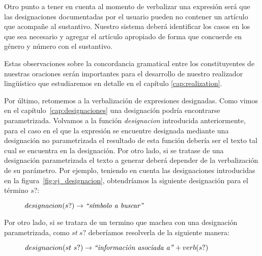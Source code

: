 Otro punto a tener en cuenta al momento de verbalizar una expresión será que las designaciones documentadas por el usuario pueden no contener un artículo que acompañe al sustantivo. Nuestro sistema deberá identificar los casos en los que sea necesario y agregar el artículo apropiado de forma que concuerde en género y número con el sustantivo. 

Estas observaciones sobre la concordancia gramatical entre los constituyentes de nuestras oraciones serán importantes para el desarrollo de nuestro realizador lingüístico que estudiaremos en detalle en el capítulo \ref{cap:realization}.

Por último, retomemos a la verbalización de expresiones designadas. Como vimos en el capítulo~\ref{cap:designaciones} una designación podría encontrarse parametrizada. Volvamos a la función \emph{designacion} introducida anteriormente, para el caso en el que la expresión se encuentre designada mediante una designación no parametrizada el resultado de esta función debería ser el texto tal cual se encuentra en la designación. Por otro lado, si se tratase de una designación parametrizada el texto a generar deberá depender de la verbalización de su parámetro. Por ejemplo, teniendo en cuenta las designaciones introducidas en la figura~\ref{fig:ej_designacion}, obtendríamos la siguiente designación para el término $s?$:

\begin{figure}[H]
\center
$designacion(s?) \rightarrow \text{\emph{``símbolo a buscar''}}$
\end{figure}

\noindent
Por otro lado, si se tratara de un termino que machea con una designación parametrizada, como $st~s?$ deberíamos resolverla de la siguiente manera: 

\begin{figure}[H]
\center
$designacion(st~s?) \rightarrow \text{\emph{``información asociada a''}} + verb(s?)$
\end{figure}



